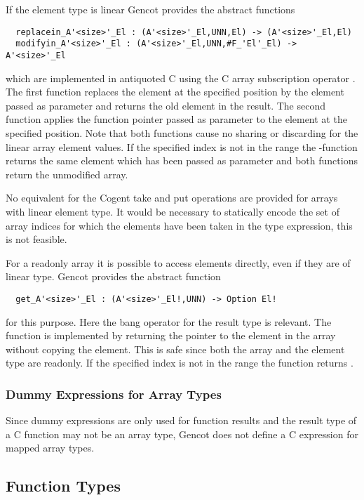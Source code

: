 If the element type is linear Gencot provides the abstract functions
\begin{verbatim}
  replacein_A'<size>'_El : (A'<size>'_El,UNN,El) -> (A'<size>'_El,El)
  modifyin_A'<size>'_El : (A'<size>'_El,UNN,#F_'El'_El) -> A'<size>'_El
\end{verbatim}
which are implemented in antiquoted C using the C array subscription operator \code{[]}. The first function
replaces the element at the specified position by the element passed as parameter and returns the old element in the result.
The second function applies the function pointer passed as parameter to the element at the specified position.
Note that both functions cause no sharing or discarding for the linear array element values. If the specified
index is not in the range  the -function returns the same element which has been
passed as parameter and both functions return the unmodified array.

No equivalent for the Cogent take and put operations are provided for arrays with linear element type. It would be
necessary to statically encode the set of array indices for which the elements have been taken in the type expression,
this is not feasible.

For a readonly array it is possible to access elements directly, even if they are of linear type. Gencot provides
the abstract function
\begin{verbatim}
  get_A'<size>'_El : (A'<size>'_El!,UNN) -> Option El!
\end{verbatim}
for this purpose. Here the bang operator for the result type is relevant. The function is implemented by returning
the pointer to the element in the array without copying the element. This is safe since both the array and the element
type are readonly. If the specified index is not in the range  the function returns .

\subsubsection{Dummy Expressions for Array Types}

Since dummy expressions are only used for function results and the result type of a C function may not be an array 
type, Gencot does not define a C expression for mapped array types.

\subsection{Function Types}
\label{design-types-function}

